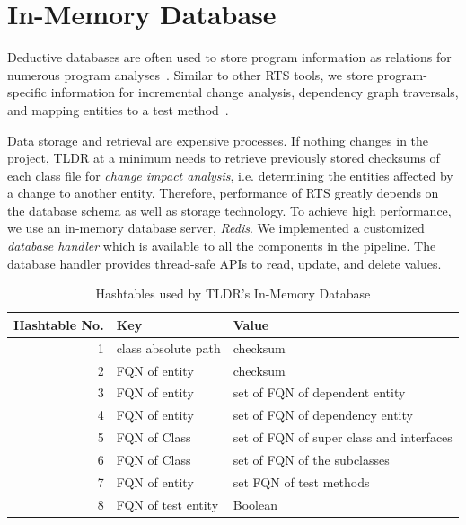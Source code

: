 \section{In-Memory Database}
Deductive databases are often used to store program information as relations for numerous program analyses~\cite{lam2005context}. Similar to other RTS tools, we store program-specific information for incremental change analysis, dependency graph traversals, and mapping entities to a test method~\cite{faulttracer, hyrts, starts, ekstazi, legunsen2016extensive}. 

Data storage and retrieval are expensive processes. If nothing changes in the project, TLDR at a minimum needs to retrieve previously stored checksums of each class file for \textit{change impact analysis}, i.e. determining the entities affected by a change to another entity. Therefore, performance of RTS greatly depends on the database schema as well as storage technology.  To achieve high performance, we use an in-memory database server, \textit{Redis}. We implemented a customized \textit{database handler} which is available to all the components in the pipeline. The database handler provides thread-safe APIs to read, update, and delete values.

\begin{table}
  \scriptsize
  \centering
  \caption{Hashtables used by TLDR's In-Memory Database}
    \begin{tabular}{r | ll}
    \multicolumn{1}{l|}{\textbf{Hashtable No.}}  & \textbf{Key} & \textbf{Value} \\
    \hline
    1     & class absolute path & checksum \\
    2     & FQN of entity & checksum \\
    3     & FQN of entity & set of FQN of dependent entity \\
    4     & FQN of entity & set of FQN of dependency entity \\
    5     & FQN of Class & set of FQN of super class and interfaces \\
    6     & FQN of Class & set of FQN of the subclasses \\
    7     & FQN of entity & set FQN of test methods \\
    8     & FQN of test entity & Boolean \\
    \hline
    \end{tabular}%
  \label{tab:hashtables}%
\end{table}


\vspace*{0.2cm}
\noindent

